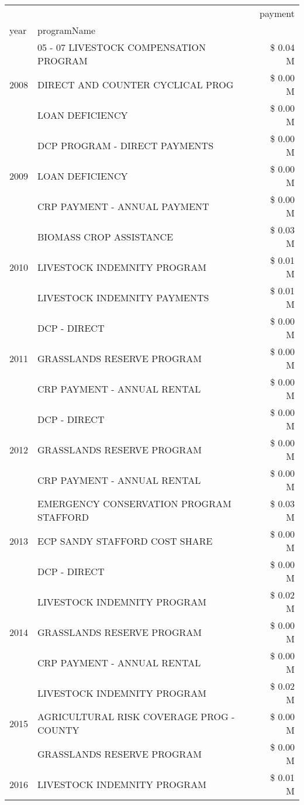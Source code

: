 \begin{tabular}{llr}
\toprule
 &  & payment \\
year & programName &  \\
\midrule
\multirow[t]{3}{*}{2008} & 05 - 07 LIVESTOCK COMPENSATION PROGRAM & \$ 0.04 M \\
 & DIRECT AND COUNTER CYCLICAL PROG & \$ 0.00 M \\
 & LOAN DEFICIENCY & \$ 0.00 M \\
\cline{1-3}
\multirow[t]{3}{*}{2009} & DCP PROGRAM - DIRECT PAYMENTS & \$ 0.00 M \\
 & LOAN DEFICIENCY & \$ 0.00 M \\
 & CRP PAYMENT - ANNUAL PAYMENT & \$ 0.00 M \\
\cline{1-3}
\multirow[t]{3}{*}{2010} & BIOMASS CROP ASSISTANCE & \$ 0.03 M \\
 & LIVESTOCK INDEMNITY PROGRAM & \$ 0.01 M \\
 & LIVESTOCK INDEMNITY PAYMENTS & \$ 0.01 M \\
\cline{1-3}
\multirow[t]{3}{*}{2011} & DCP - DIRECT & \$ 0.00 M \\
 & GRASSLANDS RESERVE PROGRAM & \$ 0.00 M \\
 & CRP PAYMENT - ANNUAL RENTAL & \$ 0.00 M \\
\cline{1-3}
\multirow[t]{3}{*}{2012} & DCP - DIRECT & \$ 0.00 M \\
 & GRASSLANDS RESERVE PROGRAM & \$ 0.00 M \\
 & CRP PAYMENT - ANNUAL RENTAL & \$ 0.00 M \\
\cline{1-3}
\multirow[t]{3}{*}{2013} & EMERGENCY CONSERVATION PROGRAM STAFFORD & \$ 0.03 M \\
 & ECP SANDY STAFFORD COST SHARE & \$ 0.00 M \\
 & DCP - DIRECT & \$ 0.00 M \\
\cline{1-3}
\multirow[t]{3}{*}{2014} & LIVESTOCK INDEMNITY PROGRAM & \$ 0.02 M \\
 & GRASSLANDS RESERVE PROGRAM & \$ 0.00 M \\
 & CRP PAYMENT - ANNUAL RENTAL & \$ 0.00 M \\
\cline{1-3}
\multirow[t]{3}{*}{2015} & LIVESTOCK INDEMNITY PROGRAM & \$ 0.02 M \\
 & AGRICULTURAL RISK COVERAGE PROG - COUNTY & \$ 0.00 M \\
 & GRASSLANDS RESERVE PROGRAM & \$ 0.00 M \\
\cline{1-3}
\multirow[t]{3}{*}{2016} & LIVESTOCK INDEMNITY PROGRAM & \$ 0.01 M \\

\end{tabular}
